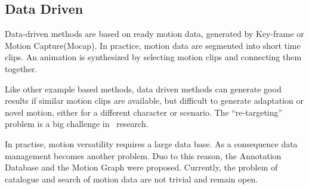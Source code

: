 \subsection{Data Driven}
Data-driven methods are based on ready motion data,  generated by Key-frame or Motion Capture(Mocap). 
In practice, motion data are segmented into short time clips. 
An animation is synthesized by selecting motion clips and connecting them together\citep{Parent2002,kovar2003flexible}.

Like other example based methods, data driven methods can generate good results if similar motion clips are available, but difficult to generate  adaptation or novel motion, either for a different character or scenario. 
The  ``re-targeting'' problem is a big challenge in \cms\ research.

In practise, motion versatility requires a large data base.
As a consequence data management becomes another problem. 
Duo to this reason, the Annotation Database \citep{Arikan2003} and the Motion Graph \citep{kovar2008motion} were proposed. 
Currently, the problem of catalogue and search of motion data are not trivial and remain open\citep{keogh2004indexing,muller2005efficient}.

